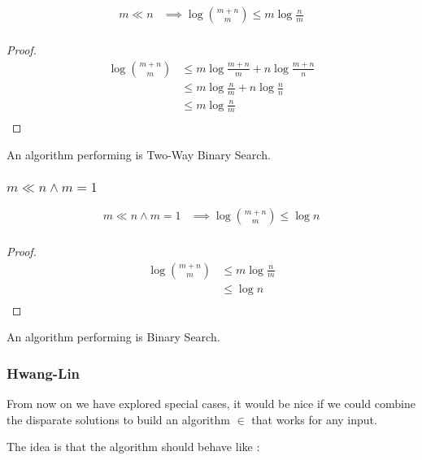 \begin{lemma}
\begin{align*}
m \ll n &\implies \log\binom{m+n}{m} \leq m \log\frac{n}{m}\\
\end{align*}
\end{lemma}

\begin{proof}
\begin{align*}
\log\binom{m+n}{m} &\leq m \log\frac{m+n}{m} + n \log\frac{m+n}{n}\\
&\leq m \log\frac{n}{m} + n \log\frac{n}{n}\\
&\leq m \log\frac{n}{m}\\
\end{align*}
\end{proof}

An algorithm performing  is Two-Way Binary Search.


\subsubsection{$m \ll n \land m = 1$}

\begin{lemma}
\begin{align*}
m \ll n \land m = 1 &\implies \log\binom{m+n}{m} \leq \log n\\
\end{align*}
\end{lemma}

\begin{proof}
\begin{align*}
\log\binom{m+n}{m} &\leq m \log\frac{n}{m}\\
&\leq \log n\\
\end{align*}
\end{proof}

An algorithm performing  is Binary Search.

\subsubsection{Hwang-Lin}

From now on we have explored special cases, it would be nice if we could combine the disparate solutions to build an algorithm $\in$  that works for any input.

The idea is that the algorithm should behave like :

